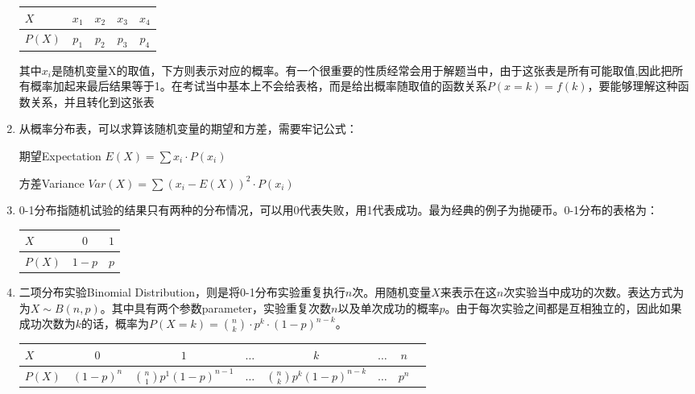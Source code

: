 \begin{enumerate}
\begin{table}[H]
\centering
\begin{tabular}{|l|c|c|c|c|}
\hline
$X$    & $x_1 $& $x_2$  & $x_3$ & $x_4$ \\ \hline
$P(X)$ & $p_1$ & $p_2$ & $p_3$ & $p_4$ \\ \hline
\end{tabular}
\end{table}

其中$x_i$是随机变量X的取值，下方则表示对应的概率。有一个很重要的性质经常会用于解题当中，由于这张表是所有可能取值,因此\textcolor{r1}{把所有概率加起来最后结果等于1}。在考试当中基本上不会给表格，而是给出概率随取值的函数关系$P(x=k)=f(k)$，要能够理解这种函数关系，并且转化到这张表

\item 从概率分布表，可以求算该随机变量的\textcolor{r1}{期望和方差}，需要牢记公式：

期望Expectation $E(X)=\sum x_i\cdot P(x_i)$

方差Variance $Var(X)=\sum (x_i-E(X))^2\cdot P(x_i)$

\item 0-1分布指随机试验的结果只有两种的分布情况，可以用0代表失败，用1代表成功。最为经典的例子为抛硬币。0-1分布的表格为：

\begin{table}[H]
\centering
\begin{tabular}{|l|c|c|}
\hline
$X$    & $0$   & $1$ \\ \hline
$P(X)$ & $1-p$ & $p$ \\ \hline
\end{tabular}
\end{table}

\item 二项分布实验Binomial Distribution，则是将0-1分布实验\textcolor{r1}{重复执行$n$次}。用随机变量$X$来表示在这$n$次实验当中\textcolor{r1}{成功的次数}。表达方式为为$X\sim B(n,p)$。其中具有两个\textcolor{r1}{参数parameter}，实验重复次数$n$以及单次成功的概率$p$。由于每次实验之间都是互相独立的，因此如果成功次数为$k$的话，概率为$P(X=k)= {n\choose k} \cdot p^k\cdot (1-p)^{n-k}$。

\begin{table}[H]
\centering
\begin{tabular}{|l|c|c|c|c|c|c|c|}
\hline
$X$    & $0$       & $1$                                                  & $\ldots$ & $k$                         & $\ldots$ & $n$   \\ \hline
$P(X)$ & $(1-p)^n$ & ${n\choose 1} p^1(1-p)^{n-1}$  & $\ldots$ & ${n\choose k} p^k(1-p)^{n-k}$ & $\ldots$ & $p^n$ \\ \hline
\end{tabular}
\end{table}


\end{enumerate}
